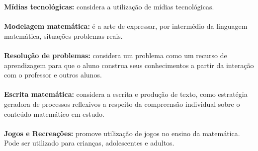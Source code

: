 \documentclass[a4paper, 12pt]{article}
\begin{document}
\begin{enumerate}
  \textbf{Mídias tecnológicas:} considera a utilização de mídias tecnológicas. \\ \\
  \textbf{Modelagem matemática:} é a arte de expressar, por intermédio da linguagem matemática, situações-problemas reais. \\ \\
  \textbf{Resolução de problemas:} considera um problema como um recurso de aprendizagem para que o aluno construa seus conhecimentos a partir da interação com o professor e outros alunos. \\ \\
  \textbf{Escrita matemática:} considera a escrita e produção de texto, como estratégia geradora de processos reflexivos a respeito da compreensão individual sobre o conteúdo matemático em estudo. \\ \\
\textbf{Jogos e Recreações:} promove utilização de jogos no ensino da matemática. Pode ser utilizado para crianças, adolescentes e adultos.
 \end{enumerate}
\end{document}
